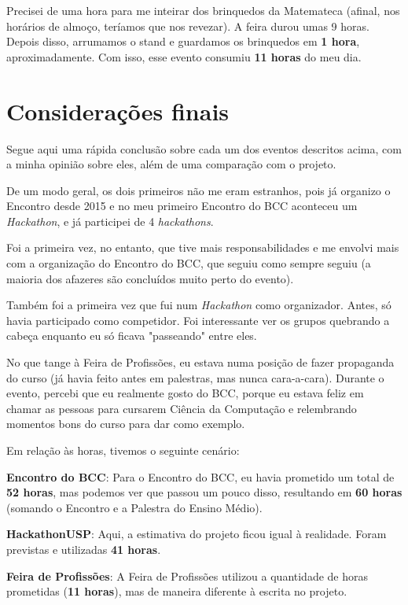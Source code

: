 \documentclass[12pt,letterpaper]{article}
\begin{document}
	Precisei de uma hora para me inteirar dos brinquedos da Matemateca (afinal, nos horários de almoço, teríamos que nos revezar). A feira durou umas 9 horas. Depois disso, arrumamos o stand e guardamos os brinquedos em \textbf{1 hora}, aproximadamente. Com isso, esse evento consumiu \textbf{11 horas} do meu dia.
	
	\section*{Considerações finais}
	Segue aqui uma rápida conclusão sobre cada um dos eventos descritos acima, com a minha opinião sobre eles, além de uma comparação com o projeto.
	
	De um modo geral, os dois primeiros não me eram estranhos, pois já organizo o Encontro desde 2015 e no meu primeiro Encontro do BCC aconteceu um \textit{Hackathon}, e já participei de 4 \textit{hackathons}.
	
	Foi a primeira vez, no entanto, que tive mais responsabilidades e me envolvi mais com a organização do Encontro do BCC, que seguiu como sempre seguiu (a maioria dos afazeres são concluídos muito perto do evento).
	
	Também foi a primeira vez que fui num \textit{Hackathon} como organizador. Antes, só havia participado como competidor. Foi interessante ver os grupos quebrando a cabeça enquanto eu só ficava "passeando" entre eles.
	
	No que tange à Feira de Profissões, eu estava numa posição de fazer propaganda do curso (já havia feito antes em palestras, mas nunca cara-a-cara). Durante o evento, percebi que eu realmente gosto do BCC, porque eu estava feliz em chamar as pessoas para cursarem Ciência da Computação e relembrando momentos bons do curso para dar como exemplo.
	
	Em relação às horas, tivemos o seguinte cenário:
	
	\textbf{Encontro do BCC}: Para o Encontro do BCC, eu havia prometido um total de \textbf{52 horas}, mas podemos ver que passou um pouco disso, resultando em \textbf{60 horas} (somando o Encontro e a Palestra do Ensino Médio).
	
	\textbf{HackathonUSP}:	Aqui, a estimativa do projeto ficou igual à realidade. Foram previstas e utilizadas \textbf{41 horas}.
	
	\textbf{Feira de Profissões}: A Feira de Profissões utilizou a quantidade de horas prometidas (\textbf{11 horas}), mas de maneira diferente à escrita no projeto.
	
\end{document}
